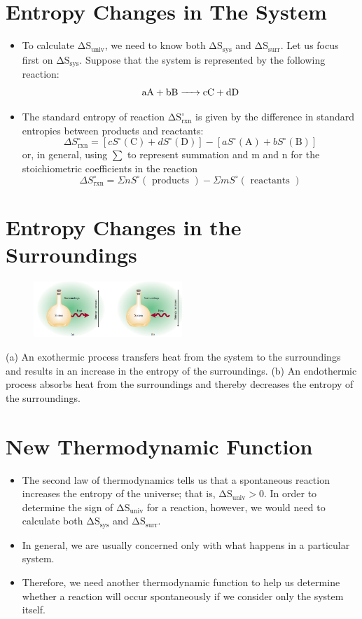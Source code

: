 \documentclass[a4paper,12pt,twocolumn]{article}
\begin{document}
\section{Entropy Changes in The System}
\begin{itemize}
\item To calculate $\mathrm{\Delta S_{univ}}$, we need to know both $\mathrm{\Delta S_{sys}}$ and $\mathrm{\Delta S_{surr}}$. Let us focus first on  $\mathrm{\Delta S_{sys}}$. Suppose that the system is represented by the following reaction:
$$\ce{aA + bB -> cC + dD}$$
\item The standard entropy of reaction  $\mathrm{\Delta S_{rxn}^{\circ}}$ is given by the difference in standard entropies between products and reactants:
$$\Delta S_{\mathrm{rxn}}^{\circ}=\left[c S^{\circ}(\mathrm{C})+d S^{\circ}(\mathrm{D})\right]-\left[a S^{\circ}(\mathrm{A})+b S^{\circ}(\mathrm{B})\right]$$
or, in general, using $\sum$ to represent summation and m and n for the stoichiometric coefficients in the reaction
$$\Delta S_{\mathrm{rxn}}^{\circ}=\Sigma n S^{\circ}(\text { products })-\Sigma m S^{\circ}(\text { reactants })$$
\end{itemize}

\section{Entropy Changes in the Surroundings}
\begin{figure}[h]
\centering
\includegraphics[width=0.5\textwidth]{Screenshot 2023-03-27 004429.png}
\end{figure}
(a) An exothermic process transfers heat from the system to the surroundings and results in an increase in the entropy of the surroundings. (b) An endothermic process absorbs heat from the surroundings and thereby decreases the entropy of the surroundings.
\section{New Thermodynamic Function}
\begin{itemize}
\item The second law of thermodynamics tells us that a spontaneous reaction increases the entropy of the universe; that is, $\mathrm{\Delta S_{univ} > 0}$. In order to determine the sign of $\mathrm{\Delta S_{univ}}$ for a reaction, however, we would need to calculate both $\mathrm{\Delta S_{sys}}$ and $\mathrm{\Delta S_{surr}}$. 
\item In general, we are usually concerned only with what happens in a particular system. 
\item Therefore, we need another thermodynamic function to help us determine whether a reaction will occur spontaneously if we consider only the system itself.
\end{itemize}
\end{document}
